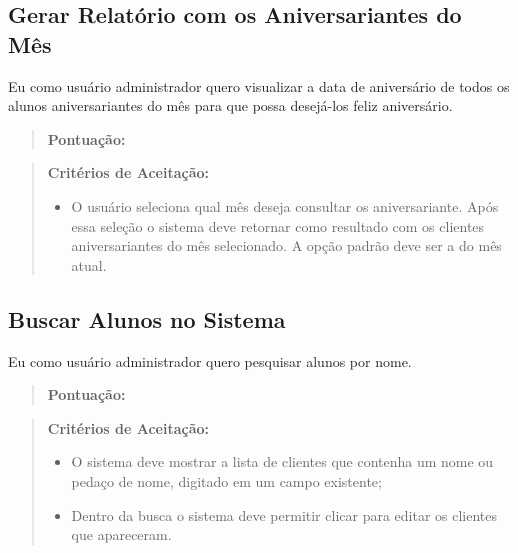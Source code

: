 \subsection[Gerar Relatório com os Aniversariantes do Mês]{Gerar Relatório com os Aniversariantes do Mês}
Eu como usuário administrador quero visualizar a data de aniversário de todos os
alunos aniversariantes do mês para que possa desejá-los feliz aniversário.
\begin{quote}
    \textbf{Pontuação:}
\end{quote}
\begin{quote}
\textbf{Critérios de Aceitação:}
    \begin{itemize}
        \item O usuário seleciona qual mês deseja consultar os aniversariante. Após essa seleção o sistema deve retornar como resultado com os clientes aniversariantes do mês selecionado. A opção padrão deve ser a do mês atual.
    \end{itemize}
\end{quote}

\subsection[Buscar Alunos no Sistema]{Buscar Alunos no Sistema}
Eu como usuário administrador quero pesquisar alunos por nome.
\begin{quote}
    \textbf{Pontuação:}
\end{quote}
\begin{quote}
\textbf{Critérios de Aceitação:}
    \begin{itemize}
        \item O sistema deve mostrar a lista de clientes que contenha um nome ou pedaço de
        nome, digitado em um campo existente;
        \item Dentro da busca o sistema deve permitir clicar para editar os clientes que
        apareceram.
    \end{itemize}
\end{quote}
